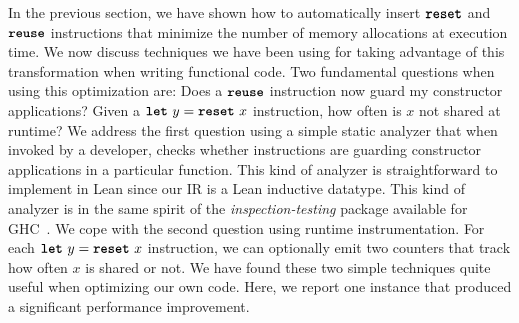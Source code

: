 In the previous section, we have shown how to automatically insert
$\texttt{\textbf{reset}}$ and $\texttt{\textbf{reuse}}$ instructions that minimize the number of
memory allocations at execution time. We now discuss techniques we have been using
for taking advantage of this transformation when writing functional
code. Two fundamental questions when using this optimization are: Does
a $\texttt{\textbf{reuse}}$ instruction now guard my constructor applications?
Given a $\texttt{\textbf{let}}\ y = \texttt{\textbf{reset}}\ x$ instruction, how often is $x$
not shared at runtime? We address the first question using a simple
static analyzer that when invoked by a developer, checks whether
 instructions are guarding constructor applications in a
particular function.  This kind of analyzer is straightforward to
implement in Lean since our IR is a Lean inductive datatype. This kind
of analyzer is in the same spirit of the \emph{inspection-testing}
package available for GHC~\cite{breitner2018promise}.
We cope with the second question using
runtime instrumentation.  For each $\texttt{\textbf{let}}\ y = \texttt{\textbf{reset}}\ x$
instruction, we can optionally emit two counters that track how often
$x$ is shared or not. We have found these two simple techniques quite
useful when optimizing our own code. Here, we report one instance
that produced a significant performance improvement.

